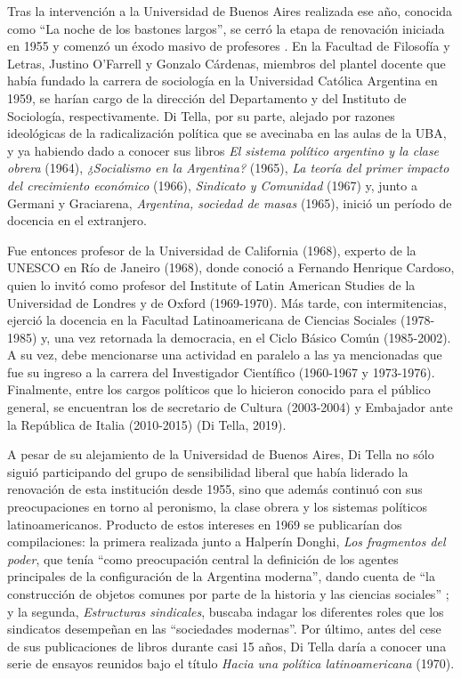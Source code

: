 Tras la intervención a la Universidad de Buenos Aires realizada ese año, conocida como \enquote{La noche de los bastones largos}, se cerró la etapa de renovación iniciada en 1955 y comenzó un éxodo masivo de profesores \parencite{1536-BUCHBINDER2010}. En la Facultad de Filosofía y Letras, Justino O'Farrell y Gonzalo Cárdenas, miembros del plantel docente que había fundado la carrera de sociología en la Universidad Católica Argentina en 1959, se harían cargo de la dirección del Departamento y del Instituto de Sociología, respectivamente. Di Tella, por su parte, alejado por razones ideológicas de la radicalización política que se avecinaba en las aulas de la UBA, y ya habiendo dado a conocer sus libros \emph{El sistema político argentino y la clase obrera} (1964), \emph{¿Socialismo en la Argentina?} (1965), \emph{La teoría del primer impacto del crecimiento económico} (1966), \emph{Sindicato y Comunidad} (1967) y, junto a Germani y Graciarena, \emph{Argentina, sociedad de masas} (1965), inició un período de docencia en el extranjero.

Fue entonces profesor de la Universidad de California (1968), experto de la UNESCO en Río de Janeiro (1968), donde conoció a Fernando Henrique Cardoso, quien lo invitó como profesor del Institute of Latin American Studies de la Universidad de Londres y de Oxford (1969-1970). Más tarde, con intermitencias, ejerció la docencia en la Facultad Latinoamericana de Ciencias Sociales (1978-1985) y, una vez retornada la democracia, en el Ciclo Básico Común (1985-2002). A su vez, debe mencionarse una actividad en paralelo a las ya mencionadas que fue su ingreso a la carrera del Investigador Científico (1960-1967 y 1973-1976). Finalmente, entre los cargos políticos que lo hicieron conocido para el público general, se encuentran los de secretario de Cultura (2003-2004) y Embajador ante la República de Italia (2010-2015) (Di Tella, 2019).

A pesar de su alejamiento de la Universidad de Buenos Aires, Di Tella no sólo siguió participando del grupo de sensibilidad liberal que había liderado la renovación de esta institución desde 1955, sino que además continuó con sus preocupaciones en torno al peronismo, la clase obrera y los sistemas políticos latinoamericanos. Producto de estos intereses en 1969 se publicarían dos compilaciones: la primera realizada junto a Halperín Donghi, \emph{Los fragmentos del poder}, que tenía \enquote{como preocupación central la definición de los agentes principales de la configuración de la Argentina moderna}, dando cuenta de \enquote{la construcción de objetos comunes por parte de la historia y las ciencias sociales} \parencite[122]{1511-SARLO2001}; y la segunda, \emph{Estructuras sindicales}, buscaba indagar los diferentes roles que los sindicatos desempeñan en las \enquote{sociedades modernas}. Por último, antes del cese de sus publicaciones de libros durante casi 15 años, Di Tella daría a conocer una serie de ensayos reunidos bajo el título \emph{Hacia una política latinoamericana} (1970).

